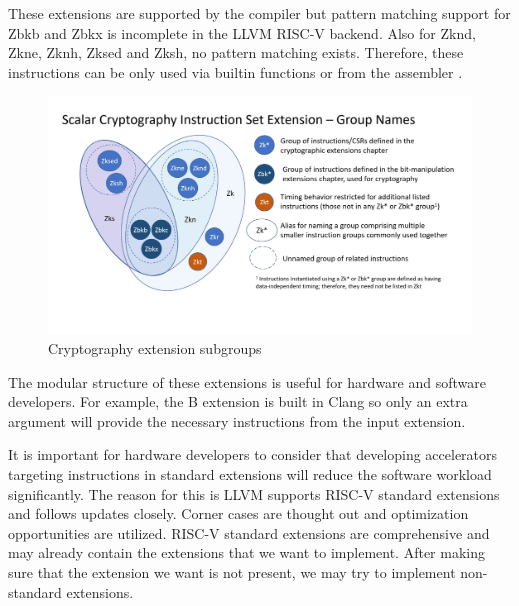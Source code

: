 These extensions are supported by the compiler but pattern matching support for Zbkb and Zbkx is incomplete in the LLVM RISC-V backend. Also for Zknd, Zkne, Zknh, Zksed and Zksh, no pattern matching exists. Therefore, these instructions can be only used via builtin functions or from the assembler \cite{llvmextensionspage}.

\begin{figure}
    \centering
    \includegraphics{riscv/cryptography_extension_subgroups.png}
    \caption{Cryptography extension subgroups \cite{cryptogroupsdiag}}
    \label{fig:cryptography_extension_subgroups}
\end{figure}

The modular structure of these extensions is useful for hardware and software developers. For example, the B extension is built in Clang so only an extra argument will provide the necessary instructions from the input extension.

It is important for hardware developers to consider that developing accelerators targeting instructions in standard extensions will reduce the software workload significantly. The reason for this is LLVM supports RISC-V standard extensions and follows updates closely. Corner cases are thought out and optimization opportunities are utilized. RISC-V standard extensions are comprehensive and may already contain the extensions that we want to implement. After making sure that the extension we want is not present, we may try to implement non-standard extensions.
